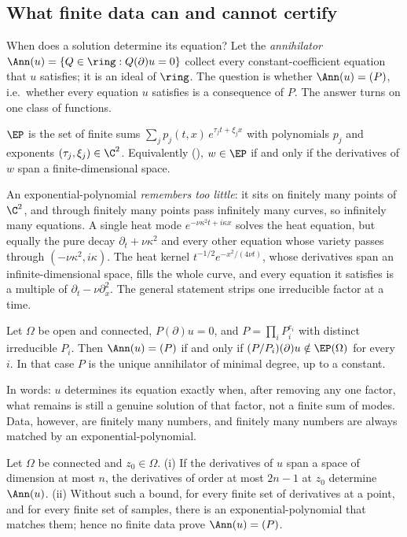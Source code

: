\subsection{What finite data can and cannot certify}\label{sec:certify}
When does a solution determine its equation? Let the \emph{annihilator} $\Ann(u)=\{Q\in\ring:Q(\partial)u=0\}$ collect
every constant-coefficient equation that $u$ satisfies; it is an ideal of $\ring$. The question is whether
$\Ann(u)=(P)$, i.e.\ whether every equation $u$ satisfies is a consequence of $P$. The answer turns on one class of
functions.

\begin{definition}\label{def:ep}
$\EP$ is the set of finite sums $\sum_jp_j(t,x)\,e^{\tau_jt+\xi_jx}$ with polynomials $p_j$ and exponents
$(\tau_j,\xi_j)\in\C^2$. Equivalently (\SMproofs), $w\in\EP$ if and only if the derivatives of $w$ span a
finite-dimensional space.
\end{definition}

An exponential-polynomial \emph{remembers too little}: it sits on finitely many points of $\C^2$, and through finitely
many points pass infinitely many curves, so infinitely many equations. A single heat mode $e^{-\nu\kappa^2t+i\kappa x}$
solves the heat equation, but equally the pure decay $\partial_t+\nu\kappa^2$ and every other equation whose variety
passes through $(-\nu\kappa^2,i\kappa)$. The heat kernel $t^{-1/2}e^{-x^2/(4\nu t)}$, whose derivatives span an
infinite-dimensional space, fills the whole curve, and every equation it satisfies is a multiple of $\partial_t-\nu\partial_x^2$.
The general statement strips one irreducible factor at a time.

\begin{theorem}[Identification]\label{thm:ident}
Let $\Omega$ be open and connected, $P(\partial)u=0$, and $P=\prod_iP_i^{e_i}$ with distinct irreducible $P_i$. Then
$\Ann(u)=(P)$ if and only if $(P/P_i)(\partial)u\notin\EP(\Omega)$ for every $i$. In that case $P$ is the unique
annihilator of minimal degree, up to a constant.
\end{theorem}

In words: $u$ determines its equation exactly when, after removing any one factor, what remains is still a genuine
solution of that factor, not a finite sum of modes. Data, however, are finitely many numbers, and finitely many numbers
are always matched by an exponential-polynomial.

\begin{proposition}\label{prop:certify}
Let $\Omega$ be connected and $z_0\in\Omega$. (i) If the derivatives of $u$ span a space of dimension at most $n$, the
derivatives of order at most $2n-1$ at $z_0$ determine $\Ann(u)$. (ii) Without such a bound, for every finite set of
derivatives at a point, and for every finite set of samples, there is an exponential-polynomial that matches them; hence
no finite data prove $\Ann(u)=(P)$.
\end{proposition}

